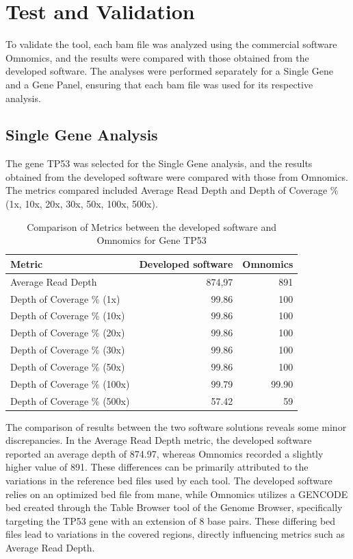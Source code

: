\section{Test and Validation}

To validate the tool, each \ac{bam} file was analyzed using the commercial software Omnomics, and the results were compared with those obtained from the developed software. The analyses were performed separately for a Single Gene and a Gene Panel, ensuring that each \ac{bam} file was used for its respective analysis.

\subsection{Single Gene Analysis}

The gene TP53 was selected for the Single Gene analysis, and the results obtained from the developed software were compared with those from Omnomics. The metrics compared included Average Read Depth and Depth of Coverage \% (1x, 10x, 20x, 30x, 50x, 100x, 500x).

\begin{table}[H]
    \centering
    \caption{Comparison of Metrics between the developed software and Omnomics for Gene TP53}
    \label{tab:omnomicsVSunilabs}
    \begin{tabular}{lrr}
    \textbf{Metric}                      & \textbf{Developed software} & \textbf{Omnomics} \\
    \hline
    Average Read Depth          & 874,97           & 891      \\
    Depth of Coverage \% (1x)   & 99.86              & 100      \\
    Depth of Coverage \% (10x)  & 99.86              & 100      \\
    Depth of Coverage \% (20x)  & 99.86              & 100      \\
    Depth of Coverage \% (30x)  & 99.86              & 100      \\
    Depth of Coverage \% (50x)  & 99.86              & 100      \\
    Depth of Coverage \% (100x) & 99.79            & 99.90     \\
    Depth of Coverage \% (500x) & 57.42            & 59      
    \end{tabular}
\end{table}

The comparison of results between the two software solutions reveals some minor discrepancies. In the Average Read Depth metric, the developed software reported an average depth of 874.97, whereas Omnomics recorded a slightly higher value of 891. These differences can be primarily attributed to the variations in the reference \ac{bed} files used by each tool. The developed software relies on an optimized \ac{bed} file from \ac{mane}, while Omnomics utilizes a GENCODE \ac{bed} created through the Table Browser tool of the Genome Browser, specifically targeting the TP53 gene with an extension of 8 base pairs. These differing \ac{bed} files lead to variations in the covered regions, directly influencing metrics such as Average Read Depth.

